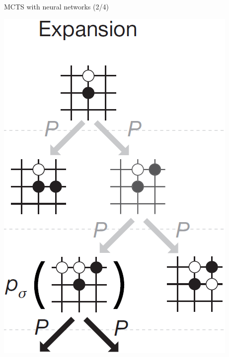 \documentclass{beamer}
\begin{document}
{    \begin{frame}{MCTS with neural networks (2/4)}
      \begin{center}
        \includegraphics[height=.85\textheight]{../img/MCTS_expansion.png}
      \end{center}
    \end{frame}

}
\end{document}
